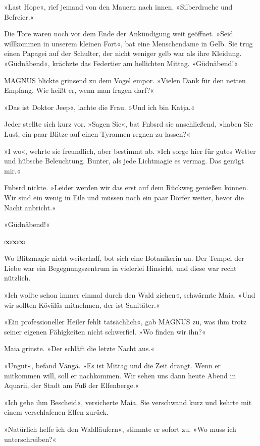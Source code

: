»Last Hope«, rief jemand von den Mauern nach innen. »Silberdrache und Befreier.«

Die Tore waren noch vor dem Ende der Ankündigung weit geöffnet. »Seid willkommen in unserem kleinen Fort«, bat eine Menschendame in Gelb. Sie trug einen Papagei auf der Schulter, der nicht weniger gelb war als ihre Kleidung. »Güdnäbend«, krächzte das Federtier am hellichten Mittag. »Güdnäbend!«

MAGNUS blickte grinsend zu dem Vogel empor. »Vielen Dank für den netten Empfang. Wie heißt er, wenn man fragen darf?«

»Das ist Doktor Jeep«, lachte die Frau. »Und ich bin Katja.«

Jeder stellte sich kurz vor. »Sagen Sie«, bat Fnbsrd sie anschließend, »haben Sie Lust, ein paar Blitze auf einen Tyrannen regnen zu lassen?«

»I wo«, wehrte sie freundlich, aber bestimmt ab. »Ich sorge hier für gutes Wetter und hübsche Beleuchtung. Bunter, als jede Lichtmagie es vermag. Das genügt mir.«

Fnbsrd nickte. »Leider werden wir das erst auf dem Rückweg genießen können. Wir sind ein wenig in Eile und müssen noch ein paar Dörfer weiter, bevor die Nacht anbricht.«

»Güdnäbend!«

\begin{center}
∞∞∞
\end{center}

Wo Blitzmagie nicht weiterhalf, bot sich eine Botanikerin an. Der Tempel der Liebe war ein Begegnungszentrum in vielerlei Hinsicht, und diese war recht nützlich.

»Ich wollte schon immer einmal durch den Wald ziehen«, schwärmte Maia. »Und wir sollten Köväläs mitnehmen, der ist Sanitäter.«

»Ein professioneller Heiler fehlt tatsächlich«, gab MAGNUS zu, was ihm trotz seiner eigenen Fähigkeiten nicht schwerfiel. »Wo finden wir ihn?«

Maia grinste. »Der schläft die letzte Nacht aus.«

»Ungut«, befand Vängä. »Es ist Mittag und die Zeit drängt. Wenn er mitkommen will, soll er nachkommen. Wir sehen uns dann heute Abend in Aquarii, der Stadt am Fuß der Elfenberge.«

»Ich gebe ihm Bescheid«, versicherte Maia. Sie verschwand kurz und kehrte mit einem verschlafenen Elfen zurück.

»Natürlich helfe ich den Waldläufern«, stimmte er sofort zu. »Wo muss ich unterschreiben?«


